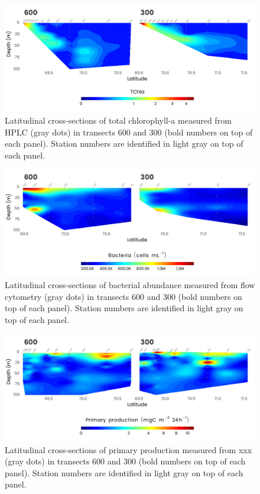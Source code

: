 \documentclass[essd, manuscript]{copernicus}
\begin{document}
\clearpage

\begin{figure}[H]
	\centering
	\includegraphics[scale = 1]{../../../graphs/fig06.pdf}
	\caption{Latitudinal cross-sections of total chlorophyll-a measured from HPLC (gray dots) in transects 600 and 300 (bold numbers on top of each panel). Station numbers are identified in light gray on top of each panel.}
\end{figure}

\clearpage

\begin{figure}[H]
	\centering
	\includegraphics[scale = 1]{../../../graphs/fig07.pdf}
	\caption{Latitudinal cross-sections of bacterial abundance measured from flow cytometry (gray dots) in transects 600 and 300 (bold numbers on top of each panel). Station numbers are identified in light gray on top of each panel.}
\end{figure}

\clearpage

\begin{figure}[H]
	\centering
	\includegraphics[scale = 1]{../../../graphs/fig08.pdf}
	\caption{Latitudinal cross-sections of primary production measured from xxx (gray dots) in transects 600 and 300 (bold numbers on top of each panel). Station numbers are identified in light gray on top of each panel.}
\end{figure}
\end{document}
